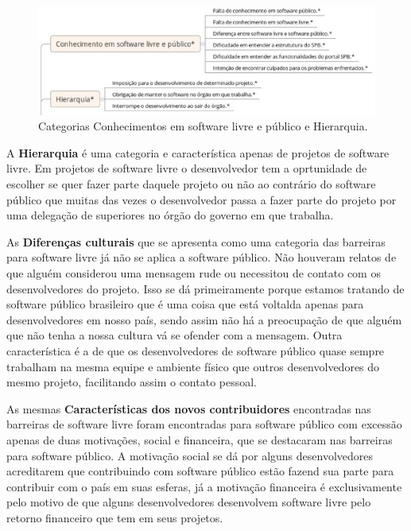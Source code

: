 \begin{figure}[h]
	\centering
	\label{fig:conhecimentos}
		\includegraphics[keepaspectratio=true,scale=0.5]{figuras/conhecimentos.eps}
	\caption{Categorias Conhecimentos em software livre e público e Hierarquia.}
\end{figure}

A \textbf{Hierarquia} é uma categoria e característica apenas de projetos de
software livre. Em projetos de software livre o desenvolvedor tem a oprtunidade
de escolher se quer fazer parte daquele projeto ou não ao contrário do software
público que muitas das vezes o desenvolvedor passa a fazer parte do projeto por
uma delegação de superiores no órgão do governo em que trabalha.

As \textbf{Diferenças culturais} que se apresenta como uma categoria das barreiras
para software livre já não se aplica a software público. Não houveram relatos de que alguém 
considerou uma mensagem rude ou necessitou de contato com os desenvolvedores do projeto.
Isso se dá primeiramente porque estamos tratando de software público brasileiro que 
é uma coisa que está voltalda apenas para desenvolvedores em nosso país, sendo assim
não há a preocupação de que alguém que não tenha a nossa cultura vá se ofender com a 
mensagem. Outra característica é a de que os desenvolvedores de software público quase
sempre trabalham na mesma equipe e ambiente físico que outros desenvolvedores do mesmo 
projeto, facilitando assim o contato pessoal.

As mesmas \textbf{Características dos novos contribuidores} encontradas nas barreiras
de software livre foram encontradas para software público com excessão apenas de duas
motivações, social e financeira, que se destacaram nas barreiras para software público.
A motivação social se dá por alguns desenvolvedores acreditarem que contribuindo com 
software público estão fazend sua parte para contribuir com o país em suas esferas, já
a motivação financeira é exclusivamente pelo motivo de que alguns desenvolvedores
desenvolvem software livre pelo retorno financeiro que tem em seus projetos.

